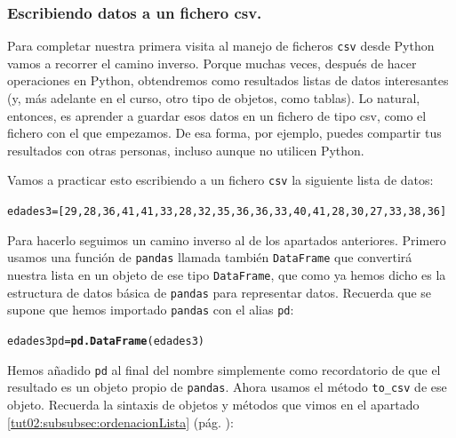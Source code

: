 \documentclass[10pt,a4paper]{article}\usepackage[]{graphicx}\usepackage[]{color}
\makeatletter
\newcommand{\hlstd}[1]{\textcolor[rgb]{0.345,0.345,0.345}{#1}}%
\newcommand{\hlkwb}[1]{\textcolor[rgb]{0.69,0.353,0.396}{#1}}%
\newcommand{\hlkwd}[1]{\textcolor[rgb]{0.737,0.353,0.396}{\textbf{#1}}}%
\newenvironment{kframe}{%
 \def\at@end@of@kframe{}%
 \ifinner\ifhmode%
  \def\at@end@of@kframe{\end{minipage}}%
  \begin{minipage}{\columnwidth}%
 \fi\fi%
 \def\FrameCommand##1{\hskip\@totalleftmargin \hskip-\fboxsep
 \colorbox{shadecolor}{##1}\hskip-\fboxsep
     \hskip-\linewidth \hskip-\@totalleftmargin \hskip\columnwidth}%
 \MakeFramed {\advance\hsize-\width
   \@totalleftmargin\z@ \linewidth\hsize
   \@setminipage}}%
 {\par\unskip\endMakeFramed%
 \at@end@of@kframe}
\newenvironment{knitrout}{}{} %
\makeatother
\begin{document}
\subsubsection*{Escribiendo datos a un fichero csv.}
\label{Tut02:subsubsec:escribiendoDatosFicheroCsv}
Para completar nuestra primera visita al manejo de ficheros {\tt csv} desde Python vamos a recorrer el camino inverso. Porque muchas veces, después de hacer operaciones en Python, obtendremos como resultados listas de datos interesantes (y, más adelante en el curso, otro tipo de objetos, como tablas). Lo natural, entonces, es aprender a guardar esos datos en un fichero de tipo csv, como el fichero con el que empezamos. De esa forma, por ejemplo, puedes compartir tus resultados con otras personas, incluso aunque no utilicen Python.

Vamos a practicar esto escribiendo a un fichero {\tt csv} la siguiente lista de datos:

\begin{knitrout}
\color{fgcolor}\begin{kframe}
\begin{alltt}
edades3 = [29, 28, 36, 41, 41, 33, 28, 32, 35, 36, 36, 33, 40, 41, 28, 30, 27, 33, 38, 36]
\end{alltt}
\end{kframe}
\end{knitrout}
Para hacerlo seguimos un camino inverso al de los apartados anteriores. Primero usamos una función de {\tt pandas} llamada también {\tt DataFrame} que convertirá nuestra lista en un objeto de ese tipo {\tt DataFrame}, que como ya hemos dicho es la estructura de datos básica de {\tt pandas} para representar datos. Recuerda que se supone que hemos importado {\tt pandas} con el alias {\tt pd}:
\begin{knitrout}
\color{fgcolor}\begin{kframe}
\begin{alltt}
\hlstd{edades3pd} \hlkwb{=} \hlkwd{pd.DataFrame}\hlstd{(edades3)}
\end{alltt}
\end{kframe}
\end{knitrout}
Hemos añadido {\tt pd} al final del nombre simplemente como recordatorio de que el resultado es un objeto propio de {\tt pandas}. Ahora usamos el método \verb#to_csv# de ese objeto. Recuerda la sintaxis de objetos y métodos que vimos en el apartado \ref{tut02:subsubsec:ordenacionLista} (pág. \pageref{tut02:subsubsec:ordenacionLista}):
\end{document}
